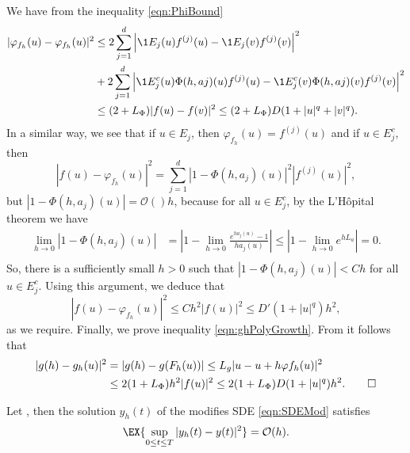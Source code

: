 \begin{pf}
	We have from the inequality \eqref{eqn:PhiBound}
	\begin{align*}
		|\varphi_{f_h}(u) - \varphi_{f_h}(u)|^2
		&\leq
			2 \sum_{j=1}^d
				\left|
					\1{E_j}(u) f^{(j)}(u)
					-\1{E_j}(v) f^{(j)}(v)
				\right|^2 \\
		&
		+
		2 \sum_{j=1}^d
			\left|
				\1{E_j^c}(u) \Phi(h,aj)(u) f^{(j)}(u)
				-\1{E_j^c}(v) \Phi(h,aj)(v) f^{(j)}(v)
%
			\right|^2 \\
		&\leq
			(2 + L_{\Phi}) |f(u) - f(v)|^2 
			\leq
				(2 + L_{\Phi}) D (1 + |u|^q +|v|^q). 
	\end{align*}
	In a similar way, we see that if $u \in E_j$, then $\varphi_{f_h}(u) = f^{(j)}(u)$ and if $u\in E_j^c$, then
	$$
		|f(u) - \varphi_{f_h}(u)|^2
		=
		\sum_{j=1}^d
			|1-\Phi(h,a_j)(u)|^2 |f^{(j)}(u)|^2,	
	$$
	but $|1-\Phi(h,a_j)(u)|=\mathcal{O}()h$, because for all $u \in E_j^c$, by the L'H\^{o}pital theorem we have
	\begin{align*}
		\lim_{h \to 0} |1-\Phi(h,a_j)(u)| 
			&= \left|
				1-\lim_{h\to 0} \frac{e^{h a_j(u)}-1}{h a_j(u)}
			\right|			
			\leq 
				\left|
					1-\lim_{h\to 0} e^{h L_a}
				\right|=0.\\			
	\end{align*}
	So, there is a sufficiently small $h>0$  such that
	$|1-\Phi(h,a_j)(u)|<C h$ for all $u\in E_j^c$.
	Using this argument, we deduce that
	$$
		|f(u) - \varphi_{f_h}(u)|^2
		\leq
		Ch^2 |f(u)|^2
		\leq D'(1+|u|^q)h^2,	
	$$
	as we require.	
	Finally, we prove inequality \eqref{eqn:ghPolyGrowth}.
	From   it follows that
	\begin{align*}
		|g(h) - g_h(u)|^2 
		&=
			|g(h) - g(F_h(u))|
		\leq
			L_g |u - u +h \varphi{f_h}(u)|^2 \\
		&\leq 
			2(1+L_{\Phi})h^2 |f(u)|^2
		\leq
			2(1+L_{\Phi}) D(1+|u|^q) h^2. 
		\qed
	\end{align*}
\end{pf}
%
\begin{lem}\label{lem:yhyOh}
	Let , then the solution $y_h(t)$ of the modifies SDE \eqref{eqn:SDEMod}
	satisfies
	\begin{equation}
		\EX{
			\sup_{0\leq t \leq T}
			|y_h(t) - y(t)|^2	
		} = \mathcal{O}(h).
	\end{equation}	
\end{lem}
